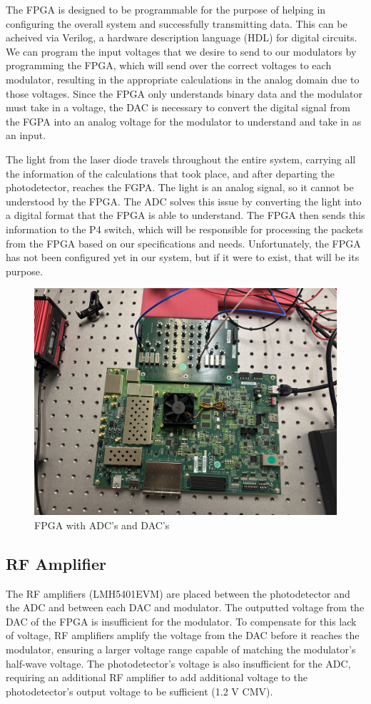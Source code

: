 \documentclass[11pt]{article}
\begin{document}
The FPGA is designed to be programmable for the purpose of helping in configuring the overall system and successfully transmitting data. This can be acheived via Verilog, a hardware description language (HDL) for digital circuits. We can program the input voltages that we desire to send to our modulators by programming the FPGA, which will send over the correct voltages to each modulator, resulting in the appropriate calculations in the analog domain due to those voltages. Since the FPGA only understands binary data and the modulator must take in a voltage, the DAC is necessary to convert the digital signal from the FGPA into an analog voltage for the modulator to understand and take in as an input.

The light from the laser diode travels throughout the entire system, carrying all the information of the calculations that took place, and after departing the photodetector, reaches the FGPA. The light is an analog signal, so it cannot be understood by the FPGA. The ADC solves this issue by converting the light into a digital format that the FPGA is able to understand. The FPGA then sends this information to the P4 switch, which will be responsible for processing the packets from the FPGA based on our specifications and needs. Unfortunately, the FPGA has not been configured yet in our system, but if it were to exist, that will be its purpose.

\begin{figure}[H]
    \centering
    \includegraphics[width=0.5\linewidth]{fpga.jpg}
    \caption{FPGA with ADC's and DAC's}
    \label{fig:enter-label}
\end{figure}

\subsection{RF Amplifier}

The RF amplifiers (LMH5401EVM) are placed between the photodetector and the ADC and between each DAC and modulator. The outputted voltage from the DAC of the FPGA is insufficient for the modulator. To compensate for this lack of voltage, RF amplifiers amplify the voltage from the DAC before it reaches the modulator, ensuring a larger voltage range capable of matching the modulator's half-wave voltage. The photodetector's voltage is also insufficient for the ADC, requiring an additional RF amplifier to add additional voltage to the photodetector's output voltage to be sufficient (1.2 V CMV).
\end{document}
